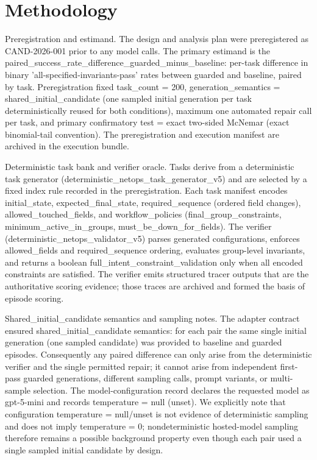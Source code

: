 \documentclass[conference]{IEEEtran}
\begin{document}
\section{Methodology}
Preregistration and estimand. The design and analysis plan were preregistered as CAND-2026-001 prior to any model calls. The primary estimand is the paired\_success\_rate\_difference\_guarded\_minus\_baseline: per-task difference in binary 'all-specified-invariants-pass' rates between guarded and baseline, paired by task. Preregistration fixed task\_count = 200, generation\_semantics = shared\_initial\_candidate (one sampled initial generation per task deterministically reused for both conditions), maximum one automated repair call per task, and primary confirmatory test = exact two-sided McNemar (exact binomial-tail convention). The preregistration and execution manifest are archived in the execution bundle.

Deterministic task bank and verifier oracle. Tasks derive from a deterministic task generator (deterministic\_netops\_task\_generator\_v5) and are selected by a fixed index rule recorded in the preregistration. Each task manifest encodes initial\_state, expected\_final\_state, required\_sequence (ordered field changes), allowed\_touched\_fields, and workflow\_policies (final\_group\_constraints, minimum\_active\_in\_groups, must\_be\_down\_for\_fields). The verifier (deterministic\_netops\_validator\_v5) parses generated configurations, enforces allowed\_fields and required\_sequence ordering, evaluates group-level invariants, and returns a boolean full\_intent\_constraint\_validation only when all encoded constraints are satisfied. The verifier emits structured tracer outputs that are the authoritative scoring evidence; those traces are archived and formed the basis of episode scoring.

Shared\_initial\_candidate semantics and sampling notes. The adapter contract ensured shared\_initial\_candidate semantics: for each pair the same single initial generation (one sampled candidate) was provided to baseline and guarded episodes. Consequently any paired difference can only arise from the deterministic verifier and the single permitted repair; it cannot arise from independent first-pass guarded generations, different sampling calls, prompt variants, or multi-sample selection. The model-configuration record declares the requested model as gpt-5-mini and records temperature = null (unset). We explicitly note that configuration temperature = null/unset is not evidence of deterministic sampling and does not imply temperature = 0; nondeterministic hosted-model sampling therefore remains a possible background property even though each pair used a single sampled initial candidate by design.
\end{document}
